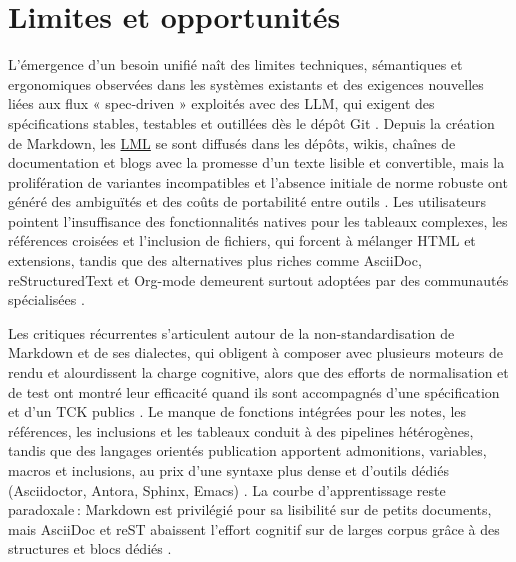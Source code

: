 \documentclass[a4paper,12pt]{article}
\begin{document}
\section{Limites et opportunités}
\label{sec:orgdf9fe64}
L’émergence d’un besoin unifié naît des limites techniques, sémantiques et ergonomiques observées dans les systèmes existants et des exigences nouvelles liées aux flux « spec-driven » exploités avec des LLM, qui exigent des spécifications stables, testables et outillées dès le dépôt Git \autocite{GithubSpeckit2025,liuHowReadMeFiles2022,markushofbauerLargeScaleCollaborativeWriting2023,mengWhatYouSee2025}. Depuis la création de Markdown, les \protect\hyperlink{gls-2}{\label{gls-2-use-3}LML} se sont diffusés dans les dépôts, wikis, chaînes de documentation et blogs avec la promesse d’un texte lisible et convertible, mais la prolifération de variantes incompatibles et l’absence initiale de norme robuste ont généré des ambiguïtés et des coûts de portabilité entre outils \autocite{johngruberMarkdownSyntax,johnmacfarlaneCommonMarkSpec2024,GitHubFlavoredMarkdown2019,MarkdownVariants2023}. Les utilisateurs pointent l’insuffisance des fonctionnalités natives pour les tableaux complexes, les références croisées et l’inclusion de fichiers, qui forcent à mélanger HTML et extensions, tandis que des alternatives plus riches comme AsciiDoc, reStructuredText et Org-mode demeurent surtout adoptées par des communautés spécialisées \autocite{allenAsciiDocSyntaxQuick,allenAsciiDocWritersGuide,goodgerReStructuredTextMarkupSpecification2025,khareUsingOrgmodeSubversion2012}.

Les critiques récurrentes s’articulent autour de la non-standardisation de Markdown et de ses dialectes, qui obligent à composer avec plusieurs moteurs de rendu et alourdissent la charge cognitive, alors que des efforts de normalisation et de test ont montré leur efficacité quand ils sont accompagnés d’une spécification et d’un TCK publics \autocite{johnmacfarlaneCommonMarkSpec2024,GitHubFlavoredMarkdown2019,EclipseProjectsAsciiDoc2025,junghansGrammarStandardizedWiki2008}. Le manque de fonctions intégrées pour les notes, les références, les inclusions et les tableaux conduit à des pipelines hétérogènes, tandis que des langages orientés publication apportent admonitions, variables, macros et inclusions, au prix d’une syntaxe plus dense et d’outils dédiés (Asciidoctor, Antora, Sphinx, Emacs) \autocite{allenAsciiDocWritersGuide,donathAdmonitionsMaterialMkDocs,goodgerReStructuredTextMarkupSpecification2025,lechtenborgerEmacsrevealSoftwareBundle2019}. La courbe d’apprentissage reste paradoxale : Markdown est privilégié pour sa lisibilité sur de petits documents, mais AsciiDoc et reST abaissent l’effort cognitif sur de larges corpus grâce à des structures et blocs dédiés \autocite{allenAsciiDocSyntaxQuick,goodgerReStructuredTextMarkupSpecification2025,markushofbauerLargeScaleCollaborativeWriting2023}.
\end{document}
